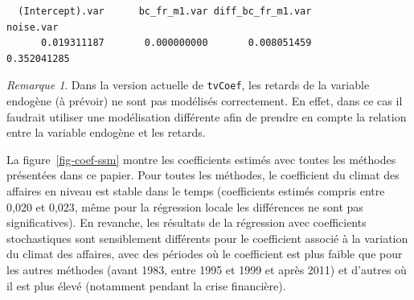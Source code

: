\documentclass[
  a4paper,
  DIV=11,
  numbers=noendperiod,
  french]{scrartcl}
\newenvironment{Shaded}{\begin{snugshade}}{\end{snugshade}}
\newcommand{\AttributeTok}[1]{\textcolor[rgb]{0.40,0.45,0.13}{#1}}
\newcommand{\ConstantTok}[1]{\textcolor[rgb]{0.56,0.35,0.01}{#1}}
\newcommand{\FloatTok}[1]{\textcolor[rgb]{0.68,0.00,0.00}{#1}}
\newcommand{\FunctionTok}[1]{\textcolor[rgb]{0.28,0.35,0.67}{#1}}
\newcommand{\NormalTok}[1]{\textcolor[rgb]{0.00,0.23,0.31}{#1}}
\newcommand{\OtherTok}[1]{\textcolor[rgb]{0.00,0.23,0.31}{#1}}
\newcommand{\SpecialCharTok}[1]{\textcolor[rgb]{0.37,0.37,0.37}{#1}}
\newcommand\1{{\mathds 1}}
\theoremstyle{remark}
\newtheorem*{remark}{Remarque}
\begin{document}
\begin{Shaded}
\end{Shaded}

\begin{verbatim}
  (Intercept).var      bc_fr_m1.var diff_bc_fr_m1.var         noise.var 
      0.019311187       0.000000000       0.008051459       0.352041285 
\end{verbatim}

\begin{remark}
Dans la version actuelle de \texttt{tvCoef}, les retards de la variable
endogène (à prévoir) ne sont pas modélisés correctement. En effet, dans
ce cas il faudrait utiliser une modélisation différente afin de prendre
en compte la relation entre la variable endogène et les retards.
\end{remark}

La figure~\ref{fig-coef-ssm} montre les coefficients estimés avec toutes
les méthodes présentées dans ce papier. Pour toutes les méthodes, le
coefficient du climat des affaires en niveau est stable dans le temps
(coefficients estimés compris entre 0,020 et 0,023, même pour la
régression locale les différences ne sont pas significatives). En
revanche, les résultats de la régression avec coefficients stochastiques
sont sensiblement différents pour le coefficient associé à la variation
du climat des affaires, avec des périodes où le coefficient est plus
faible que pour les autres méthodes (avant 1983, entre 1995 et 1999 et
après 2011) et d'autres où il est plus élevé (notamment pendant la crise
financière).
\end{document}
